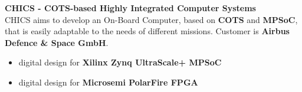 \documentclass[letterpaper]{twentysecondcv} %
\begin{document}
\begin{twenty}
{            \vspace{1 mm}
            \textbf{CHICS - COTS-based Highly Integrated Computer Systems}\\
            CHICS aims to develop an On-Board Computer, based on \textbf{COTS} and
            \textbf{MPSoC}, that is easily adaptable to the needs of
            different missions. Customer is \textbf{Airbus Defence \& Space GmbH}.
            \vspace{1 mm}
            \begin{itemize}
                \item digital design for \textbf{Xilinx Zynq UltraScale+ MPSoC}
                \item digital design for \textbf{Microsemi PolarFire FPGA}
            \end{itemize}

}
\end{twenty}
\end{document}

